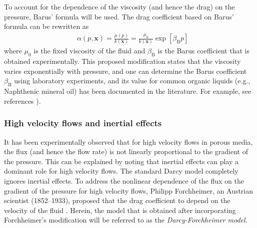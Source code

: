 \documentclass[11pt,reqno]{amsart}
\begin{document}
To account for the dependence of the viscosity 
(and hence the drag) on the pressure, Barus' 
formula \cite{Szeri}will be used. The drag 
coefficient based on Barus' formula can be 
rewritten as
\begin{align}
  \label{Eqn:GE_Barus}
  &\alpha(p,\mathbf{x}) = \frac{\mu(p)}{k(\mathbf{x})} = 
  \frac{\mu_0}{k(\mathbf{x})} \exp[\beta_{\mathrm{B}} p]
\end{align}
where $\mu_0$ is the fixed viscosity of the fluid and 
$\beta_{\mathrm{B}}$ is the Barus coefficient that is 
obtained experimentally. This proposed modification 
states that the viscosity varies exponentially with 
pressure, and one can determine the Barus coefficient 
$\beta_{\mathrm{B}}$ using laboratory experiments, and 
its value for common organic liquids (e.g., Naphthenic 
mineral oil) has been documented in the literature. 
For example, see references 
\cite{Bridgman,Abramson_PRE_2009_v80_021201,
Vesovic_Wakeham_Olchowy_Sengers_Watson_Millat_JPhysChem_1990_v19_p763,
Hoglund_Wear_1999_v232_p176}). 

\subsubsection{High velocity flows and inertial effects}
It has been experimentally observed that for high velocity 
flows in porous media, the flux (and hence the flow rate) 
is not linearly proportional to the gradient of the pressure. 
This can be explained by noting that inertial effects can 
play a dominant role for high velocity flows. The standard 
Darcy model completely ignores inertial effects. To address 
the nonlinear dependence of the flux on the gradient of the 
pressure for high velocity flows, Philipp Forchheimer, an 
Austrian scientist (1852--1933), proposed that the drag 
coefficient to depend on the velocity of the fluid 
\cite{Forchheimer_1901_v45_p1782}. Herein, the model 
that is obtained after incorporating Forchheimer's 
modification will be referred to as the 
\emph{Darcy-Forchheimer model}. 
\end{document}
